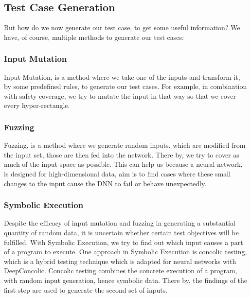 \subsection{Test Case Generation}
But how do we now generate our test case, to get some useful information?
We have, of course, multiple methods to generate our test cases:

\subsubsection{Input Mutation}
Input Mutation, is a method where we take one of the inputs and transform it, by some predefined rules, to generate our test cases.
For example, in combination with safety coverage, we try to mutate the input in that way so that we cover every hyper-rectangle.
\subsubsection{Fuzzing}
Fuzzing, is a method where we generate random inputs, which are modified from the input set, those are then fed into the network.
There by, we try to cover as much of the input space as possible.
This can help us because a neural network, is designed for high-dimensional data, aim is to find cases where these small changes to the input cause the DNN to fail or behave unexpectedly.

\subsubsection{Symbolic Execution}
Despite the efficacy of input mutation and fuzzing in generating a substantial quantity of random data, it is uncertain whether certain test objectives will be fulfilled.
With Symbolic Execution, we try to find out which input causes a part of a program to execute.
One approach in Symbolic Execution is concolic testing, which is a hybrid testing technique which is adapted for neural networks with DeepConcolic.
Concolic testing combines the concrete execution of a program, with random input generation, hence symbolic data.
There by, the findings of the first step are used to generate the second set of inputs.

